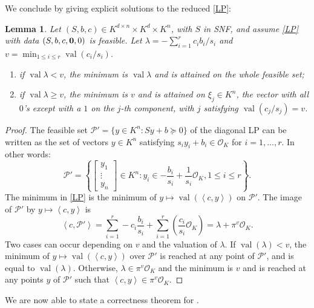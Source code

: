 \documentclass{elsarticle}
\theoremstyle{plain}
\newtheorem{lemma}[theorem]{Lemma}
\theoremstyle{definition}
\newcommand{\PP}{\mathcal{P}}
\DeclareMathOperator{\val}{val}
\newcommand{\OK}{\mathcal{O}_K}
\begin{document}
We conclude by giving explicit solutions to the reduced \eqref{LP}:

\begin{lemma}\label{solutions}
  Let $(S,b,c) \in K^{d\times n} \times K^d \times K^n$, with $S$ in SNF,
  and assume \eqref{LP} with data $(S,b,c,{\bf 0},0)$ is feasible.
  Let $\lambda = -\sum_{i=1}^r c_i b_i/s_i$ and $v = \min_{1\le i\le r} \val (c_i/s_i)$.
  \begin{enumerate}
  \item
    if $\val \lambda < v$, the minimum is $\val \lambda$ and is attained on the whole feasible
    set; \label{solutions:it1}
  \item
    if $\val \lambda \geq v$, the minimum is $v$ and is attained on
    $\xi_j \in K^n$, the vector with all $0$'s except with a $1$ on the $j$-th component,
    with $j$ satisfying $\val (c_j/s_j) = v$. \label{solutions:it2}
  \end{enumerate}
\end{lemma}
\begin{proof}
  The feasible set $\PP' = \{y \in K^n : Sy+b \succeq 0\}$ of the diagonal LP can be written
  as the set of vectors $y \in K^n$ satisfying $s_i y_i + b_i \in \OK$ for $i=1,...,r$.
  In other words:
  $$
  \PP' = \left\{\left[\begin{smallmatrix} y_1\\ \vdots\\ y_n \end{smallmatrix}\right] \in K^n :
  y_i \in -\frac{b_i}{s_i} + \frac{1}{s_i} \OK, 1\le i\le r\right\}.
  $$
  The minimum in \eqref{LP} is the minimum of
  $y \mapsto \val\left(\left\langle c,y \right\rangle\right)$ on $\PP'$.
  The image of $\PP'$ by $y \mapsto \left\langle c,y \right\rangle$ is
  \[
  \left\langle c,\PP' \right\rangle = \sum_{i=1}^r -c_i \frac{b_i}{s_i} +
  \sum_{i=1}^r\left( \frac{c_i}{s_{i}} \OK \right) = \lambda + \pi^{v} \OK.
  \]
  Two cases can occur depending on $v$ and the valuation of $\lambda$.
  If $\val(\lambda) < v$, the minimum of $y\mapsto \val\left(\left\langle c,y \right\rangle\right)$
  over $\PP'$ is reached at any point of $\PP'$, and is equal to $\val(\lambda)$.
  Otherwise, $\lambda \in \pi^{v} \OK$ and the minimum is $v$ and is reached at any points $y$ of $\PP'$ such that
  $\left\langle c,y \right\rangle \in \pi^v\OK$.
\end{proof}

We are now able to state a correctness theorem for .
\end{document}
